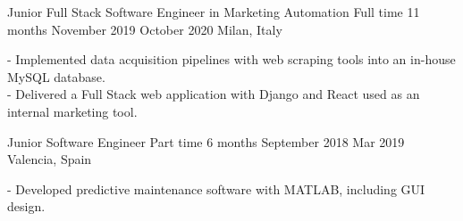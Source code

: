 {Junior Full Stack Software Engineer in Marketing Automation} 
{Full time}
{11 months}
{November 2019}
{October 2020}
{Milan, Italy} \\
{
    \raggedright
	- Implemented data acquisition pipelines with web scraping tools into an
	in-house MySQL database. \\
    - Delivered a Full Stack web application with Django and React used as an
    internal marketing tool.
}
\medskip

{Junior Software Engineer}
{Part time}
{6 months}
{September 2018}
{Mar 2019}
{Valencia, Spain} \\
{
    \raggedright
    - Developed predictive maintenance software with MATLAB, including GUI design.
}
\medskip
